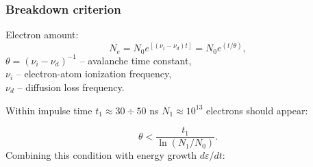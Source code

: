 \documentclass{beamer}
\begin{document}
	\begin{frame}
		\frametitle{Breakdown criterion}
		Electron amount:
		$$ N_e = N_0 e^{\left[(\nu_i - \nu_d) t\right]} = N_0 e^{(t/\theta)},$$
		$\theta = (\nu_i - \nu_d)^{-1}$ -- avalanche time constant,\\
		$\nu_i$ -- electron-atom ionization frequency,\\
		$\nu_d$ -- diffusion loss frequency.
		
		Within impulse time $t_1 \approx 30 \div 50$ ns $N_1 \approx 10^{13}$ electrons should appear:
		
		$$ \theta < \frac{t_1}{\ln( N_1 / N_0)}.$$
		Combining this condition with energy growth $d\varepsilon/dt$:
		\begin{center}
		\end{center}
		
		
		
	\end{frame}
	
\end{document}
